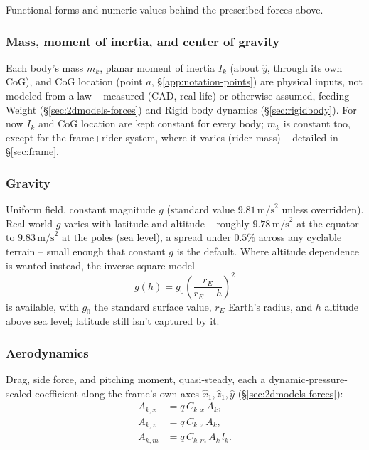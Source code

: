 Functional forms and numeric values behind the prescribed forces above.

\subsubsection{Mass, moment of inertia, and center of gravity}
\label{sec:mass-inertia}
Each body's mass $m_k$, planar moment of inertia $I_k$ (about $\hat y$, through its own CoG), and CoG location (point $a$, \S\ref{app:notation-points}) are physical inputs, not modeled from a law -- measured (CAD, real life) or otherwise assumed, feeding Weight (\S\ref{sec:2dmodels-forces}) and Rigid body dynamics (\S\ref{sec:rigidbody}). For now $I_k$ and CoG location are kept constant for every body; $m_k$ is constant too, except for the frame+rider system, where it varies (rider mass) -- detailed in \S\ref{sec:frame}.

\subsubsection{Gravity}
\label{sec:gravity}
Uniform field, constant magnitude $g$ (standard value $9.81\,\text{m/s}^2$ unless overridden). Real-world $g$ varies with latitude and altitude -- roughly $9.78\,\text{m/s}^2$ at the equator to $9.83\,\text{m/s}^2$ at the poles (sea level), a spread under $0.5\%$ across any cyclable terrain -- small enough that constant $g$ is the default. Where altitude dependence is wanted instead, the inverse-square model
\begin{equation}
    g(h) = g_0\left(\frac{r_E}{r_E+h}\right)^2
\end{equation}
is available, with $g_0$ the standard surface value, $r_E$ Earth's radius, and $h$ altitude above sea level; latitude still isn't captured by it.

\subsubsection{Aerodynamics}
\label{sec:aerodynamics-model}
Drag, side force, and pitching moment, quasi-steady, each a dynamic-pressure-scaled coefficient along the frame's own axes $\hat{x}_1,\hat{z}_1,\hat y$ (\S\ref{sec:2dmodels-forces}):
\begin{align}
    A_{k,x} &= q\,C_{k,x}\,A_k, \\
    A_{k,z} &= q\,C_{k,z}\,A_k, \\
    A_{k,m} &= q\,C_{k,m}\,A_k\,l_k.
\end{align}

